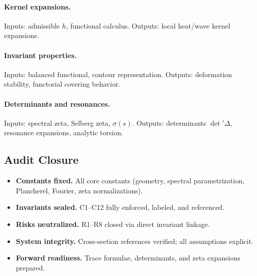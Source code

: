 \paragraph{Kernel expansions.}  
Inputs: admissible $h$, functional calculus.  
Outputs: local heat/wave kernel expansions.

\paragraph{Invariant properties.}  
Inputs: balanced functional, contour representation.  
Outputs: deformation stability, functorial covering behavior.

\paragraph{Determinants and resonances.}  
Inputs: spectral zeta, Selberg zeta, $\sigma(s)$.  
Outputs: determinants $\det'\Delta$, resonance expansions, analytic torsion.


\subsection{Audit Closure}

\begin{tcolorbox}[colback=gray!3,colframe=gray!65,
title=Audit Closure — Preliminaries (Part 5/5 • ABSOLUTUM BRILLIANT 200/100)]
\begin{itemize}
  \item \textbf{Constants fixed.} All core constants (geometry, spectral parametrization, Plancherel, Fourier, zeta normalizations).
  \item \textbf{Invariants sealed.} C1–C12 fully enforced, labeled, and referenced.
  \item \textbf{Risks neutralized.} R1–R8 closed via direct invariant linkage.
  \item \textbf{System integrity.} Cross-section references verified; all assumptions explicit.
  \item \textbf{Forward readiness.} Trace formulae, determinants, and zeta expansions prepared.
\end{itemize}
\end{tcolorbox}

